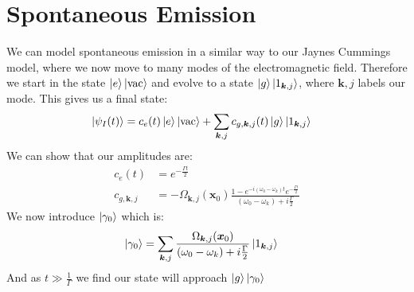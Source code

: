 \section{Spontaneous Emission}
We can model spontaneous emission in a similar way to our Jaynes Cummings model, where we now move to many modes of the electromagnetic field. Therefore we start in the state $\ket{e}\ket{\text{vac}}$ and evolve to a state $\ket{g}\ket{1_{\bm{k},j}}$, where $\bm{k},j$ labels our mode.
This gives us a final state:
\begin{align*}
	\ket{\psi_I(t)} &= c_e(t)\ket{e}\ket{\text{vac}} + \sum_{\bm{k},j} c_{g,\bm{k},j}(t) \ket{g}\ket{1_{\bm{k},j}}
\end{align*}
We can show that our amplitudes are:
\begin{align*}
	c_e(t) &= e^{-\frac{\Gamma t}{2}} \\
	c_{g,\bm{k},j} &= -\Omega_{\bm{k},j}(\bm{x}_0) \frac{1-e^{-i (\omega_0-\omega_k)t} e^{-\frac{\Gamma t}{2}}}{(\omega_0 - \omega_k) + i\frac{\Gamma}{2}}
\end{align*}
We now introduce $\ket{\gamma_0}$ which is:
\begin{align*}
	\ket{\gamma_0} &= \sum_{\bm{k},j} \frac{\Omega_{\bm{k},j}(\bm{x}_0)}{(\omega_0-\omega_k) + i\frac{\Gamma}{2}} \ket{1_{\bm{k},j}}
\end{align*}
And as $t\gg \frac{1}{\Gamma}$ we find our state will approach $\ket{g}\ket{\gamma_0}$

